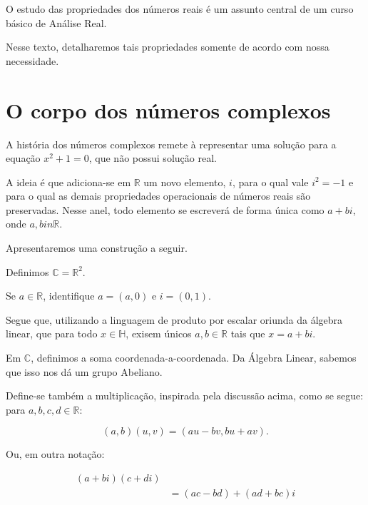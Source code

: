O estudo das propriedades dos números reais é um assunto central de um curso básico de Análise Real.

Nesse texto, detalharemos tais propriedades somente de acordo com nossa necessidade.

\section{O corpo dos números complexos}
A história dos números complexos remete à representar uma solução para a equação $x^2+1=0$, que não possui solução real.

A ideia é que adiciona-se em $\mathbb R$ um novo elemento, $i$, para o qual vale $i^2=-1$ e para o qual as demais propriedades operacionais de números reais são preservadas. Nesse anel, todo elemento se escreverá de forma única como $a+bi$, onde $a,bin \mathbb R$.

Apresentaremos uma construção a seguir.

\begin{definition}[Quaternions]
    Definimos $\mathbb C=\mathbb R^2$.
    
    Se $a \in \mathbb R$, identifique $a=(a, 0)$ e $i=(0, 1)$.

    Segue que, utilizando a linguagem de produto por escalar oriunda da álgebra linear, que para todo $x \in \mathbb H$, exisem únicos $a, b\in \mathbb R$ tais que $x=a+bi$.

    Em $\mathbb C$, definimos a soma coordenada-a-coordenada. Da Álgebra Linear, sabemos que isso nos dá um grupo Abeliano.

    Define-se também a multiplicação, inspirada pela discussão acima, como se segue: para $a, b, c, d \in \mathbb R$:

    \begin{equation*}
        (a, b)(u, v)=(au-bv, bu+av).
    \end{equation*}

    Ou, em outra notação:

    \begin{align*}
    (a+bi)(c+di)& \\
    &=(ac-bd)+(ad+bc)i
    \end{align*}
\end{definition}

